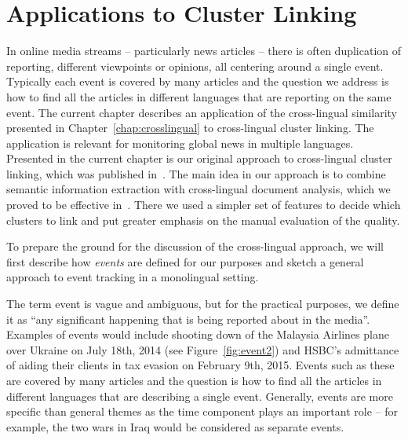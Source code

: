 %
\chapter{Applications to Cluster Linking}\label{chap:applications}

In online media streams -- particularly news articles -- there is often duplication of reporting,
different viewpoints or opinions, all centering around a single event. Typically each event is covered by many articles
and the question we address is how to find all the articles in different languages that are reporting on the same event.
The current chapter describes an application of the cross-lingual similarity presented in Chapter~\ref{chap:crosslingual}
to cross-lingual cluster linking. The application is relevant for monitoring global news in multiple languages.
Presented in the current chapter is our original approach to cross-lingual cluster linking,
which was published in~\cite{rupnikJAIR}. The main idea in our approach is to combine
semantic information extraction with cross-lingual document analysis, which we proved to be
effective in~\cite{Belyaeva201564}. There we used a simpler set of features to
decide which clusters to link and put greater emphasis on the manual evaluation of the quality.

To prepare the ground for the discussion of the cross-lingual approach, we will first
describe how \emph{events} are defined for our purposes and
sketch a general approach to event tracking in a monolingual setting.

The term event is vague and ambiguous, but for the practical purposes, we define 
it as ``any significant happening that is being reported about in the media''. 
Examples of events would include shooting down of the Malaysia Airlines plane over 
Ukraine on July 18th, 2014 (see Figure~\ref{fig:event2}) and HSBC's admittance of 
aiding their clients in tax evasion on February 9th, 2015. Events such as these are 
covered by many articles and the question is how to find all the articles in 
different languages that are describing a single event. Generally, events are more 
specific than general themes as the time component plays an important role -- 
for example, the two wars in Iraq would be considered as separate events.


